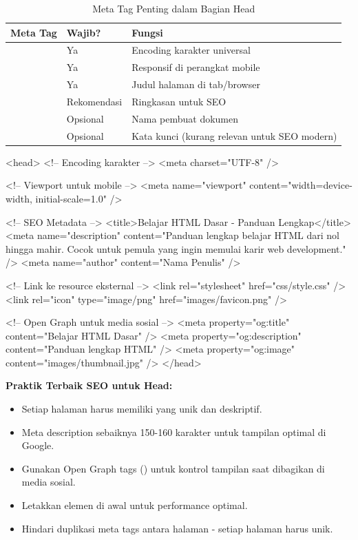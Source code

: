 \begin{table}[htbp]
\centering
\begin{tabular}{|P{4cm}|P{2.5cm}|P{5cm}|}
\hline
\textbf{Meta Tag} & \textbf{Wajib?} & \textbf{Fungsi} \\
\hline
{} & Ya & Encoding karakter universal \\
\hline
{} & Ya & Responsif di perangkat mobile \\
\hline
{} & Ya & Judul halaman di tab/browser \\
\hline
{} & Rekomendasi & Ringkasan untuk SEO \\
\hline
{} & Opsional & Nama pembuat dokumen \\
\hline
{} & Opsional & Kata kunci (kurang relevan untuk SEO modern) \\
\hline
\end{tabular}
\caption{Meta Tag Penting dalam Bagian Head}
\label{tab:meta-tags}
\end{table}

\begin{webcode}[language=HTML, caption={Contoh Bagian Head yang Lengkap}]
<head>
  <!-- Encoding karakter -->
  <meta charset="UTF-8" />
  
  <!-- Viewport untuk mobile -->
  <meta name="viewport" 
        content="width=device-width, initial-scale=1.0" />
  
  <!-- SEO Metadata -->
  <title>Belajar HTML Dasar - Panduan Lengkap</title>
  <meta name="description" 
        content="Panduan lengkap belajar HTML dari nol hingga mahir. 
                 Cocok untuk pemula yang ingin memulai karir web development." />
  <meta name="author" content="Nama Penulis" />
  
  <!-- Link ke resource eksternal -->
  <link rel="stylesheet" href="css/style.css" />
  <link rel="icon" type="image/png" href="images/favicon.png" />
  
  <!-- Open Graph untuk media sosial -->
  <meta property="og:title" content="Belajar HTML Dasar" />
  <meta property="og:description" content="Panduan lengkap HTML" />
  <meta property="og:image" content="images/thumbnail.jpg" />
</head>
\end{webcode}

\begin{catatan}
\textbf{Praktik Terbaik SEO untuk Head:}
\begin{itemize}[leftmargin=*]
  \item Setiap halaman harus memiliki  yang unik dan deskriptif.
  \item Meta description sebaiknya 150-160 karakter untuk tampilan optimal di Google.
  \item Gunakan Open Graph tags () untuk kontrol tampilan saat dibagikan di media sosial.
  \item Letakkan elemen  di awal  untuk performance optimal.
  \item Hindari duplikasi meta tags antara halaman - setiap halaman harus unik.
\end{itemize}
\end{catatan}

